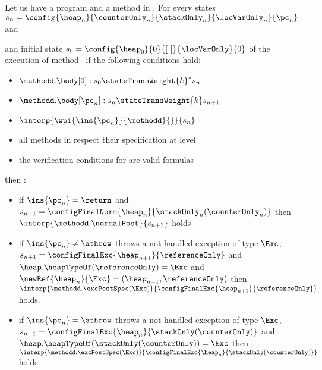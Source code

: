 \begin{lemma} \label{lemma0}
Let us have a program \Program{} and a method \methodd{} in \Program.
For every states $s_n =\config{\heap_n }{\counterOnly_n }{\stackOnly_n }{\locVarOnly_n }{\pc_n } $ and

and initial state $s_{0} =\config{\heap_{0}  }{ 0 }{\lbrack \ \rbrack }{\locVarOnly }{ 0 } $ 
   of the execution of method \methodd \  if the following conditions hold: 
 \begin{itemize}
         \item $ \methodd.\body[0] : s_{0} \stateTransWeight{k}^{*} s_n$
         \item $ \methodd.\body[\pc_n] : s_n \stateTransWeight{k} s_{n+1}$
         \item $ \interp{\wpi{\ins{\pc_n}}{\methodd}{}}{s_n} $
	 \item all methods in \Program{} respect their specification at level   
	 \item the verification conditions for \Program{} are valid formulas
 \end{itemize}
  
  then : 
 \begin{itemize}
         
        \item if  $ \ins{\pc_n} = \return $ and $s_{n+1} =\configFinalNorm{\heap_n}{\stackOnly_n( \counterOnly_n )} $  then  $ \interp{\methodd.\normalPost}{s_{n+1}}  $   holds
	
	\item if $\ins{\pc_n}\neq \athrow  $ throws a not handled exception of type $\Exc$,
	 $ s_{n+1} = \configFinalExc{ \heap_{n+1}}{  \referenceOnly   }$ and $\heap.\heapTypeOf(\referenceOnly) = \Exc  $ and  $\newRef{\heap_n}{\Exc} = (\heap_{n+1}, \referenceOnly )$
	 then  $\interp{\methodd.\excPostSpec( \Exc)}{\configFinalExc{ \heap_{n+1}}{  \referenceOnly   } } $ holds.
	
	 \item if $\ins{\pc_n} = \athrow $ throws a not handled exception of type $\Exc$,
	 	 $ s_{n+1} =\configFinalExc{ \heap_{n}}{  \stackOnly (\counterOnly)} $ and $\heap.\heapTypeOf(\stackOnly (\counterOnly) ) = \Exc  $ 
	 then  $\interp{\methodd.\excPostSpec( \Exc)}{\configFinalExc{ \heap_{n}}{  \stackOnly (\counterOnly)   } } $  holds.
	 

\end{itemize}
\end{lemma}
